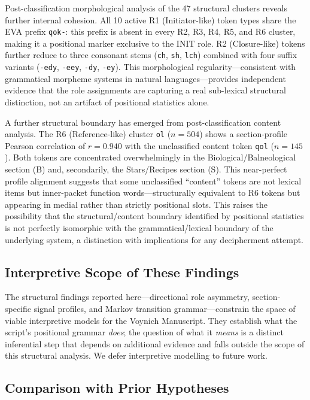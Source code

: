 \documentclass[11pt,a4paper,twocolumn]{article}
\begin{document}
Post-classification morphological analysis of the 47 structural clusters reveals further internal cohesion. All 10 active R1 (Initiator-like) token types share the EVA prefix \texttt{qok-}: this prefix is absent in every R2, R3, R4, R5, and R6 cluster, making it a positional marker exclusive to the INIT role. R2 (Closure-like) tokens further reduce to three consonant stems (\texttt{ch}, \texttt{sh}, \texttt{lch}) combined with four suffix variants (\texttt{-edy}, \texttt{-eey}, \texttt{-dy}, \texttt{-ey}). This morphological regularity---consistent with grammatical morpheme systems in natural languages---provides independent evidence that the role assignments are capturing a real sub-lexical structural distinction, not an artifact of positional statistics alone.

A further structural boundary has emerged from post-classification content analysis. The R6 (Reference-like) cluster \texttt{ol} ($n = 504$) shows a section-profile Pearson correlation of $r = 0.940$ with the unclassified content token \texttt{qol} ($n = 145$). Both tokens are concentrated overwhelmingly in the Biological/Balneological section (B) and, secondarily, the Stars/Recipes section (S). This near-perfect profile alignment suggests that some unclassified ``content'' tokens are not lexical items but inner-packet function words---structurally equivalent to R6 tokens but appearing in medial rather than strictly positional slots. This raises the possibility that the structural/content boundary identified by positional statistics is not perfectly isomorphic with the grammatical/lexical boundary of the underlying system, a distinction with implications for any decipherment attempt.

\subsection{Interpretive Scope of These Findings}

The structural findings reported here---directional role asymmetry, section-specific signal profiles, and Markov transition grammar---constrain the space of viable interpretive models for the Voynich Manuscript. They establish what the script's positional grammar \textit{does}; the question of what it \textit{means} is a distinct inferential step that depends on additional evidence and falls outside the scope of this structural analysis. We defer interpretive modelling to future work.

\subsection{Comparison with Prior Hypotheses}
\end{document}
